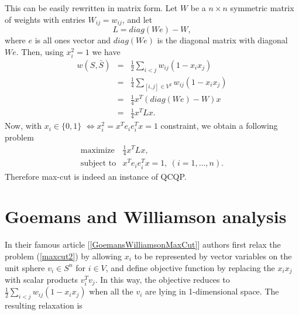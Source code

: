 \documentclass[12pt]{book}
\theoremstyle{definition}
\begin{document}
This can be easily rewritten in matrix form. Let $W$ be a $n\times n$ symmetric matrix of weights with entries $W_{ij} = w_{ij}$, and let
\begin{equation}
\label{LaplacianMatrix}
L = diag(We) - W,
\end{equation}
 where $e$ is all ones vector and $diag(We)$ is the diagonal matrix with diagonal $We$.
Then, using $x_i^2 = 1$ we have
\begin{eqnarray*}
w(S,\bar{S}) & = & \frac{1}{2}\sum_{i<j}w_{ij}(1-x_ix_j )  \\
			 & = & \frac{1}{4}\sum_{[i,j]\in V^2}w_{ij}(1-x_ix_j ) \\
			 & = & \frac{1}{4}x^T(diag(We) - W)x  \\
			 & = & \frac{1}{4}x^TLx.
\end{eqnarray*}
Now, with $x_i \in \{0,1\}$ $\Leftrightarrow x_i^2 = x^Te_ie_i^Tx = 1$ constraint, we obtain a following problem
\begin{equation}
\label{maxcut3}
\begin{array}{ll}
\mbox{maximize} & \frac{1}{4}x^TLx, \\
\mbox{subject to} &  x^Te_ie_i^Tx = 1, \  (i = 1,\dots ,n).
\end{array}
\end{equation}
Therefore max-cut is indeed an instance of QCQP.


\section{Goemans and Williamson analysis}
\label{SectionGoemansAndWIlliamson}

In their famous article [\ref{GoemansWilliamsonMaxCut}] authors first relax the problem (\ref{maxcut2})
by allowing $x_i$ to be represented by vector variables on the unit sphere $v_i\in S^n$ for $i\in V$,  
and define objective function by replacing the $x_ix_j$ with scalar products $v_i^Tv_j$.
In this way, the objective reduces to $ \frac{1}{2}\sum_{i<j}w_{ij}(1-x_ix_j )$ when all the $v_i$ are lying in 1-dimensional space.
The resulting relaxation is 
 
\end{document}
